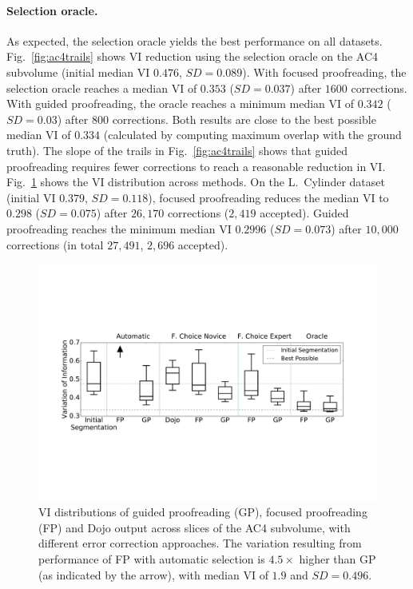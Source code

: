 \paragraph{Selection oracle.} As expected, the selection oracle yields the best performance on all datasets. Fig.~\ref{fig:ac4trails} shows VI reduction using the selection oracle on the AC4 subvolume (initial median VI $0.476$, $SD=0.089$). With focused proofreading, the selection oracle reaches a median VI of $0.353$ ($SD=0.037$) after $1600$ corrections. With guided proofreading, the oracle reaches a minimum median VI of $0.342$ ($SD=0.03$) after $800$ corrections. Both results are close to the best possible median VI of $0.334$ (calculated by computing maximum overlap with the ground truth). The slope of the trails in Fig.~\ref{fig:ac4trails} shows that guided proofreading requires fewer corrections to reach a reasonable reduction in VI. Fig.~\ref{fig:ac4boxplot} shows the VI distribution across methods. On the L.~Cylinder dataset (initial VI $0.379$, $SD=0.118$), focused proofreading reduces the median VI to $0.298$ ($SD=0.075$) after $26,170$ corrections ($2,419$ accepted). Guided proofreading reaches the minimum median VI $0.2996$ ($SD=0.073$) after $10,000$ corrections (in total $27,491$, $2,696$ accepted).

\begin{figure}[t]
\centering
\includegraphics[width=\linewidth]{gfx/ac4boxplot.pdf}
\caption{VI distributions of guided proofreading (GP), focused proofreading (FP) and Dojo output across slices of the AC4 subvolume, with different error correction approaches. The variation resulting from performance of FP with automatic selection is $4.5\times$ higher than GP (as indicated by the arrow), with median VI of $1.9$ and $SD=0.496$.}
\label{fig:ac4boxplot}
\end{figure}


